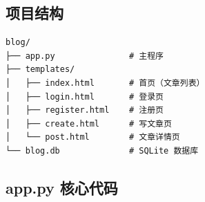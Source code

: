\documentclass[a4paper,12pt]{ctexart}
\begin{document}
\subsection*{项目结构}

\begin{verbatim}
blog/
├── app.py               # 主程序
├── templates/
│   ├── index.html       # 首页（文章列表）
│   ├── login.html       # 登录页
│   ├── register.html    # 注册页
│   ├── create.html      # 写文章页
│   └── post.html        # 文章详情页
└── blog.db              # SQLite 数据库
\end{verbatim}

\subsection*{app.py 核心代码}
\end{document}
